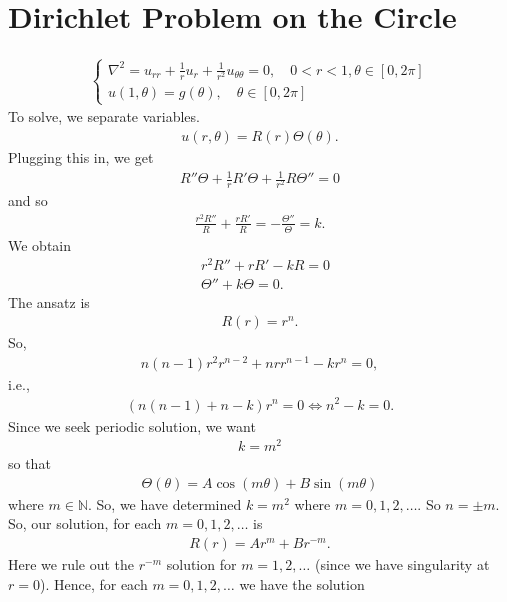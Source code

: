 \documentclass{article}
\theoremstyle{definition}
\newcommand{\f}[2]{\frac{#1}{#2}}
\begin{document}
\newpage

\section{Dirichlet Problem on the Circle}

\begin{align*}
\begin{cases}
\nabla^2 = u_{rr} + \frac{1}{r}u_r + \frac{1}{r^2}u_{\theta\theta} = 0, \quad 0<r<1, \theta\in[0,2\pi]\\
u(1,\theta) = g(\theta), \quad \theta \in [0,2\pi]
\end{cases}
\end{align*}
To solve, we separate variables.
\begin{align*}
u(r,\theta) = R(r)\Theta(\theta).
\end{align*}
Plugging this in, we get
\begin{align*}
R''\Theta + \frac{1}{r}R'\Theta + \frac{1}{r^2}R\Theta'' = 0
\end{align*}
and so
\begin{align*}
\f{r^2R''}{R} + \f{rR'}{R} = -\f{\Theta''}{\Theta} = k.
\end{align*}
We obtain 
\begin{align*}
&r^2R'' + rR' - kR = 0\\
&\Theta'' + k\Theta = 0.
\end{align*}
The ansatz is
\begin{align*}
R(r) = r^n.
\end{align*}
So,
\begin{align*}
n(n-1)r^2r^{n-2} + nrr^{n-1} - kr^n = 0,
\end{align*}
i.e.,
\begin{align*}
(n(n-1) + n - k)r^n = 0 \iff n^2 - k = 0.
\end{align*}
Since we seek periodic solution, we want
\begin{align*}
k = m^2
\end{align*}
so that
\begin{align*}
\Theta(\theta) = A\cos(m\theta) + B\sin(m\theta)
\end{align*}
where $m\in\mathbb{N}$. So, we have determined $k = m^2$ where $m=0,1,2,\dots$. So $n = \pm m$. So, our solution, for each $m=0,1,2,\dots$ is
\begin{align*}
R(r) = Ar^m + Br^{-m}.
\end{align*}
Here we rule out the $r^{-m}$ solution for $m=1,2,\dots$ (since we have singularity at $r=0$). Hence, for each $m=0,1,2,\dots$ we have the solution
\end{document}
